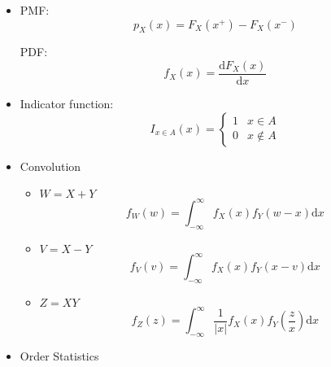     \begin{itemize}
        \item

        \begin{center}
            \parbox[t]{8.65cm}{PMF:\begin{equation}        p_X(x)=F_X(x^+)-F_X(x^-)\end{equation}}
            \parbox[t]{8.65cm}{PDF:
            \begin{equation}        
                f_X(x)=\frac{\mathrm{d}F_X(x)}{\mathrm{d}x}
            \end{equation}}
        \end{center}
        
        
        
        \item Indicator function:
        \begin{equation}    
            I_{x\in A}(x)=\begin{cases}
                1& x\in  A\\
                0& x\notin A
            \end{cases}
        \end{equation}
        \item Convolution
        \begin{itemize}
            \item $W=X+Y$
            \begin{equation}        
                f_W(w)=\int_{-\infty}^\infty f_X(x)f_Y(w-x)\mathrm{d}x    
            \end{equation}
            \item $V=X-Y$
            \begin{equation}        
                f_V(v)=\int_{-\infty}^\infty f_X(x)f_Y(x-v)\mathrm{d}x    
            \end{equation}
            \item $Z=XY$
            \begin{equation}        
                f_Z(z)=\int_{-\infty}^\infty \frac{1}{|x|}f_X(x)f_Y(\frac{z}{x})\mathrm{d}x
            \end{equation}
        \end{itemize}
        
        \item Order Statistics
        

\end{itemize}
